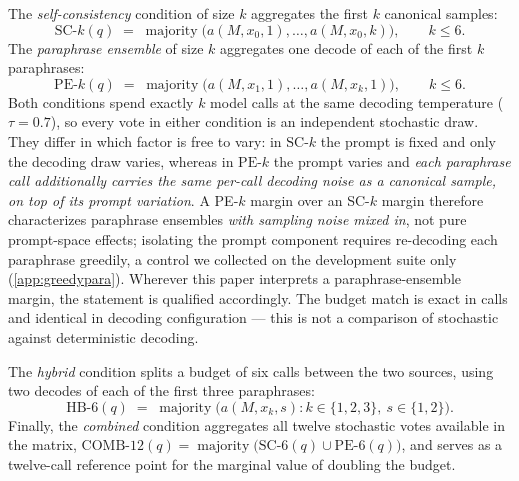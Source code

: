 The \emph{self-consistency} condition of size $k$ aggregates the first $k$ canonical samples:
\begin{equation}
\mathrm{SC}\text{-}k(q) \;=\; \operatorname*{majority}\bigl( a(M, x_0, 1), \dots, a(M, x_0, k) \bigr), \qquad k \le 6 .
\end{equation}
The \emph{paraphrase ensemble} of size $k$ aggregates one decode of each of the first $k$ paraphrases:
\begin{equation}
\mathrm{PE}\text{-}k(q) \;=\; \operatorname*{majority}\bigl( a(M, x_1, 1), \dots, a(M, x_k, 1) \bigr), \qquad k \le 6 .
\end{equation}
Both conditions spend exactly $k$ model calls at the same decoding temperature ($\tau = 0.7$), so every vote in either condition is an independent stochastic draw. They differ in which factor is free to vary: in $\mathrm{SC}\text{-}k$ the prompt is fixed and only the decoding draw varies, whereas in $\mathrm{PE}\text{-}k$ the prompt varies and \emph{each paraphrase call additionally carries the same per-call decoding noise as a canonical sample, on top of its prompt variation}. A PE-$k$ margin over an SC-$k$ margin therefore characterizes paraphrase ensembles \emph{with sampling noise mixed in}, not pure prompt-space effects; isolating the prompt component requires re-decoding each paraphrase greedily, a control we collected on the development suite only (\ref{app:greedypara}). Wherever this paper interprets a paraphrase-ensemble margin, the statement is qualified accordingly. The budget match is exact in calls and identical in decoding configuration --- this is not a comparison of stochastic against deterministic decoding.

The \emph{hybrid} condition splits a budget of six calls between the two sources, using two decodes of each of the first three paraphrases:
\begin{equation}
\mathrm{HB}\text{-}6(q) \;=\; \operatorname*{majority}\bigl( a(M, x_k, s) : k \in \{1,2,3\},\ s \in \{1,2\} \bigr).
\end{equation}
Finally, the \emph{combined} condition aggregates all twelve stochastic votes available in the matrix, $\mathrm{COMB}\text{-}12(q) = \operatorname{majority}\bigl( \mathrm{SC}\text{-}6(q) \cup \mathrm{PE}\text{-}6(q) \bigr)$, and serves as a twelve-call reference point for the marginal value of doubling the budget.


